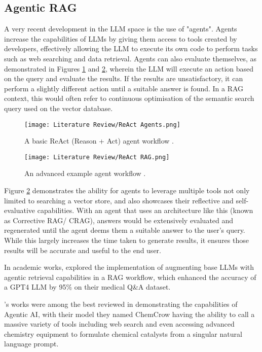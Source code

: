 \subsection{Agentic RAG}\label{sec:LitReviewAgenticRAG}
A very recent development in the LLM space is the use of "agents". Agents increase the capabilities of LLMs by giving them 
access to tools created by developers, effectively allowing the LLM to execute its own code to perform tasks such as web searching 
and data retrieval. Agents can also evaluate themselves, as demonstrated in Figures \ref{fig:ReActAgents} and \ref{fig:ReActRAG}, 
wherein the LLM will execute an action based on the query and evaluate the results. If the results are unsatisfactory, it can perform a slightly 
different action until a suitable answer is found. In a RAG context, this would often refer to continuous optimisation of the semantic search query 
used on the vector database.

\begin{figure}[H] 
    \centering
    \texttt{[image: Literature Review/ReAct Agents.png]}
    \caption{A basic ReAct (Reason + Act) agent workflow \autocite{weaviateWhatAgenticRAG2024}.}
    \label{fig:ReActAgents}
\end{figure}

\begin{figure}[H] 
    \centering
    \texttt{[image: Literature Review/ReAct RAG.png]}
    \caption{An advanced example agent workflow \autocite{weaviateWhatAgenticRAG2024}.}
    \label{fig:ReActRAG}
\end{figure}

Figure \ref{fig:ReActRAG} demonstrates the ability for agents to leverage multiple tools not only limited to searching a vector store,
and also showcases their reflective and self-evaluative capabilities. With an agent that uses an architecture like this (known as Corrective RAG/
CRAG), answers would be extensively evaluated and regenerated until the agent deems them a suitable answer to the user's query. While this largely increases the time taken to generate results, it ensures those results will be accurate and useful to the end user. 

In academic works, \textcite{wooCustomLargeLanguage2025} explored the implementation of augmenting base LLMs with agentic retrieval 
capabilities in a RAG workflow, which enhanced the accuracy of a GPT4 LLM by 95\% on their medical Q\&A dataset.

\textcite{m.branAugmentingLargeLanguage2024}'s works were among the best reviewed in demonstrating the capabilities of 
Agentic AI, with their model they named ChemCrow having the ability to call a massive variety of tools including web search 
and even accessing advanced chemistry equipment to formulate chemical catalysts from a singular natural language prompt.


